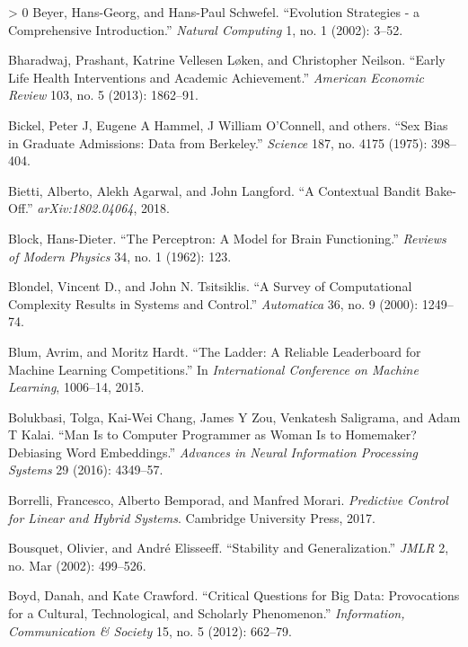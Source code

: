\documentclass{tufte-book}
\newlength{\cslhangindent}
\newenvironment{CSLReferences}[3] %
 {%
  \setlength{\parindent}{0pt}
  \ifodd #1 \everypar{\setlength{\hangindent}{\cslhangindent}}\ignorespaces\fi
  \ifnum #2 > 0
  \setlength{\parskip}{#3\baselineskip}
  \fi
 }%
 {
 }
\begin{document}
\begin{CSLReferences}{1}{0}
\leavevmode\hypertarget{ref-Beyer02}{}%
Beyer, Hans-Georg, and Hans-Paul Schwefel. {``{Evolution Strategies} - a
Comprehensive Introduction.''} \emph{Natural Computing} 1, no. 1 (2002):
3--52.

\leavevmode\hypertarget{ref-bharadwaj2013early}{}%
Bharadwaj, Prashant, Katrine Vellesen Løken, and Christopher Neilson.
{``Early Life Health Interventions and Academic Achievement.''}
\emph{American Economic Review} 103, no. 5 (2013): 1862--91.

\leavevmode\hypertarget{ref-bickel1975sex}{}%
Bickel, Peter J, Eugene A Hammel, J William O'Connell, and others.
{``Sex Bias in Graduate Admissions: Data from Berkeley.''}
\emph{Science} 187, no. 4175 (1975): 398--404.

\leavevmode\hypertarget{ref-bietti2018contextual}{}%
Bietti, Alberto, Alekh Agarwal, and John Langford. {``A Contextual
Bandit Bake-Off.''} \emph{arXiv:1802.04064}, 2018.

\leavevmode\hypertarget{ref-block1962perceptron}{}%
Block, Hans-Dieter. {``The Perceptron: A Model for Brain Functioning.''}
\emph{Reviews of Modern Physics} 34, no. 1 (1962): 123.

\leavevmode\hypertarget{ref-blondel2000survey}{}%
Blondel, Vincent D., and John N. Tsitsiklis. {``A Survey of
Computational Complexity Results in Systems and Control.''}
\emph{Automatica} 36, no. 9 (2000): 1249--74.

\leavevmode\hypertarget{ref-blum2015ladder}{}%
Blum, Avrim, and Moritz Hardt. {``The Ladder: A Reliable Leaderboard for
Machine Learning Competitions.''} In \emph{International Conference on
Machine Learning}, 1006--14, 2015.

\leavevmode\hypertarget{ref-bolukbasi2016man}{}%
Bolukbasi, Tolga, Kai-Wei Chang, James Y Zou, Venkatesh Saligrama, and
Adam T Kalai. {``Man Is to Computer Programmer as Woman Is to Homemaker?
Debiasing Word Embeddings.''} \emph{Advances in Neural Information
Processing Systems} 29 (2016): 4349--57.

\leavevmode\hypertarget{ref-BorrelliMPCBook}{}%
Borrelli, Francesco, Alberto Bemporad, and Manfred Morari.
\emph{Predictive Control for Linear and Hybrid Systems}. Cambridge
University Press, 2017.

\leavevmode\hypertarget{ref-bousquet2002stability}{}%
Bousquet, Olivier, and André Elisseeff. {``Stability and
Generalization.''} \emph{JMLR} 2, no. Mar (2002): 499--526.

\leavevmode\hypertarget{ref-boyd2012critical}{}%
Boyd, Danah, and Kate Crawford. {``Critical Questions for Big Data:
Provocations for a Cultural, Technological, and Scholarly Phenomenon.''}
\emph{Information, Communication \& Society} 15, no. 5 (2012): 662--79.


\end{CSLReferences}
\end{document}
